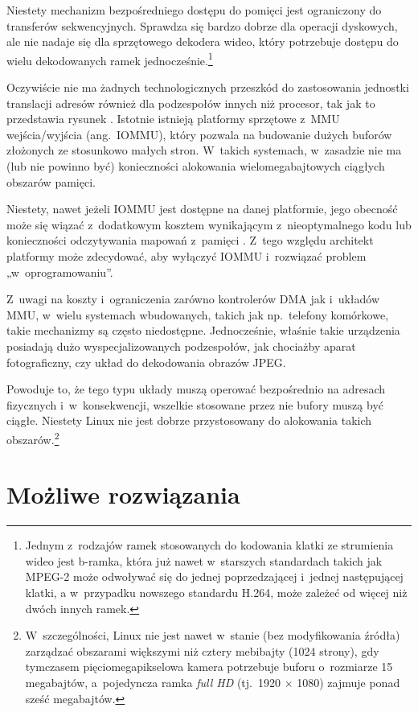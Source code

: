 Niestety mechanizm bezpośredniego dostępu do pomięci jest ograniczony
do transferów sekwencyjnych.  Sprawdza się bardzo dobrze dla operacji
dyskowych, ale nie nadaje się dla sprzętowego dekodera wideo, który
potrzebuje dostępu do wielu dekodowanych ramek
jednocześnie.\footnote{Jednym z~rodzajów ramek stosowanych do
  kodowania klatki ze strumienia wideo jest b-ramka, która już nawet
  w~starszych standardach takich jak MPEG-2 może odwoływać się do
  jednej poprzedzającej i~jednej następującej klatki, a w~przypadku
  nowszego standardu H.264, może zależeć od więcej niż dwóch innych
  ramek.}

Oczywiście nie ma żadnych technologicznych przeszkód do zastosowania
jednostki translacji adresów również dla podzespołów innych niż
procesor, tak jak to przedstawia rysunek .
Istotnie istnieją platformy sprzętowe z~MMU wejścia/wyjścia
(ang.\ IOMMU), który pozwala na budowanie dużych buforów złożonych ze
stosunkowo małych stron.  W~takich systemach, w~zasadzie nie ma (lub
nie powinno być) konieczności alokowania wielomegabajtowych ciągłych
obszarów pamięci.

Niestety, nawet jeżeli IOMMU jest dostępne na danej platformie, jego
obecność może się wiązać z~dodatkowym kosztem wynikającym
z~nieoptymalnego kodu \autocite{bib:price-of-safety} lub konieczności
odczytywania mapowań z~pamięci
\autocite{bib:mitigate-iotlb-bottleneck}.  Z~tego względu architekt
platformy może zdecydować, aby wyłączyć IOMMU i~rozwiązać problem
„w~oprogramowaniu”.

Z~uwagi na koszty i~ograniczenia zarówno kontrolerów DMA jak i~układów
MMU, w~wielu systemach wbudowanych, takich jak np.\ telefony
komórkowe, takie mechanizmy są często niedostępne.  Jednocześnie,
właśnie takie urządzenia posiadają dużo wyspecjalizowanych
podzespołów, jak chociażby aparat fotograficzny, czy układ do
dekodowania obrazów JPEG.

Powoduje to, że tego typu układy muszą operować bezpośrednio na
adresach fizycznych i~w~konsekwencji, wszelkie stosowane przez nie
bufory muszą być ciągłe.  Niestety Linux nie jest dobrze przystosowany
do alokowania takich obszarów.\footnote{W~szczególności, Linux nie
  jest nawet w~stanie (bez modyfikowania źródła) zarządzać obszarami
  większymi niż cztery mebibajty (1024 strony), gdy tymczasem
  pięciomegapikselowa kamera potrzebuje buforu o~rozmiarze 15
  megabajtów, a~pojedyncza ramka \textit{full HD} (tj.\ 1920 $\times$
  1080) zajmuje ponad sześć megabajtów.}


\section{Możliwe rozwiązania}

